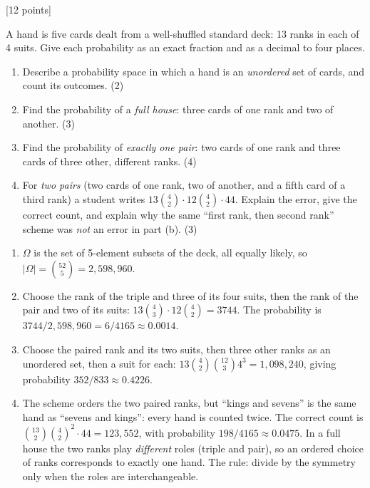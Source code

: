 \documentclass[11pt,letterpaper]{article}
\newcommand{\pts}[1]{\hfill\textcolor{muted}{\small[#1 points]}}
\newcommand{\partpts}[1]{\unskip\nobreak\hspace{.3em}\mbox{\textcolor{muted}{\small(#1)}}}
\newcounter{problem}
\newcommand{\problem}[2]{\par\addvspace{11pt}\Needspace{7\baselineskip}\stepcounter{problem}{\bfseries\color{indigo}\theproblem.\ #1}\pts{#2}\par\nobreak}
\begin{document}
\problem{Poker hands}{12}
A hand is five cards dealt from a well-shuffled standard deck: 13 ranks
in each of 4 suits. Give each probability as an exact fraction and as a
decimal to four places.
\begin{enumerate}
 \item Describe a probability space in which a hand is an \emph{unordered}
 set of cards, and count its outcomes. \partpts{2}
 \item Find the probability of a \emph{full house}: three cards of one rank
 and two of another. \partpts{3}
 \item Find the probability of \emph{exactly one pair}: two cards of one
 rank and three cards of three other, different ranks. \partpts{4}
 \item For \emph{two pairs} (two cards of one rank, two of another, and a
 fifth card of a third rank) a student writes
 $13\binom42\cdot12\binom42\cdot44$. Explain the error, give the correct
 count, and explain why the same ``first rank, then second rank'' scheme
 was \emph{not} an error in part (b). \partpts{3}
\end{enumerate}
\begin{solution}
\begin{enumerate}
 \item $\Omega$ is the set of 5-element subsets of the deck, all equally
 likely, so $|\Omega|=\binom{52}5=2{,}598{,}960$.
 \item Choose the rank of the triple and three of its four suits, then
 the rank of the pair and two of its suits:
 $13\binom43\cdot12\binom42=3744$. The probability is
 $3744/2{,}598{,}960=6/4165\approx0.0014$.
 \item Choose the paired rank and its two suits, then three other ranks
 as an unordered set, then a suit for each:
 $13\binom42\binom{12}3 4^3=1{,}098{,}240$, giving probability
 $352/833\approx0.4226$.
 \item The scheme orders the two paired ranks, but ``kings and sevens''
 is the same hand as ``sevens and kings'': every hand is counted twice.
 The correct count is
 $\binom{13}2\binom42^2\cdot44=123{,}552$, with probability
 $198/4165\approx0.0475$. In a full house the two ranks play
 \emph{different} roles (triple and pair), so an ordered choice of ranks
 corresponds to exactly one hand. The rule: divide by the symmetry only
 when the roles are interchangeable.
\end{enumerate}
\end{solution}
\end{document}
